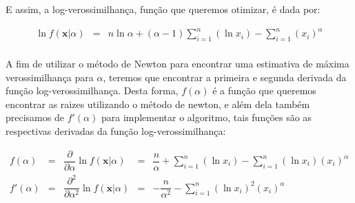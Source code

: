 \documentclass[a4paper, 11pt]{article}
\begin{document}
E assim, a log-verossimilhança, função que queremos otimizar, é dada por:

\begin{equation*}
\begin{array}{lclll}
\ln f(\textbf{x}|\alpha) & = & n \ln\alpha + (\alpha -1)\displaystyle\sum_{i=1}^{n}\left(\ln x_{i}\right) -\displaystyle\sum_{i=1}^{n}\left(x_{i}\right)^{\alpha}  \\[10pt] 
\end{array}
\end{equation*}

A fim de utilizar o método de Newton para encontrar uma estimativa de máxima verossimilhança para $\alpha$, teremos que encontrar a primeira e segunda derivada da função log-verossimilhança. Desta forma, $f(\alpha)$ é a função que queremos encontrar as raizes utilizando o método de newton, e além dela também precisamos de $f'(\alpha)$ para implementar o algoritmo, tais funções são as respectivas derivadas da função log-verossimilhança:

\begin{equation*}
\begin{array}{lclclll}
f(\alpha) & = & \dfrac{\partial}{\partial\alpha}\ln f(\textbf{x}|\alpha) & = & \dfrac{n}{\alpha} + \displaystyle\sum_{i=1}^{n}\left(\ln x_{i}\right) -\displaystyle\sum_{i=1}^{n}(\ln x_{i})\left(x_{i}\right)^{\alpha}  \\[14pt] 
f'(\alpha) & = & \dfrac{\partial^2}{\partial\alpha^2}\ln
f(\textbf{x}|\alpha) & = & -\dfrac{n}{\alpha^2} -\displaystyle\sum_{i=1}^{n}(\ln x_{i})^{2}\left(x_{i}\right)^{\alpha}  \\[10pt] 
\end{array}
\end{equation*}


\end{document}
